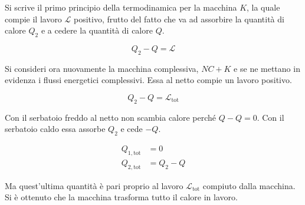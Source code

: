 \begin{figure}[htpb]
\end{figure}
\FloatBarrier
Si scrive il primo principio della termodinamica per la macchina $K$, la quale compie il lavoro $	\mathcal{L}$ positivo, frutto del fatto che va ad assorbire la quantità di calore $Q_2$ e a cedere la quantità di calore $Q$.

\[
	Q_2 - Q = \mathcal{L}
\]

Si consideri ora nuovamente la macchina complessiva, $NC+K$ e se ne mettano in evidenza i flussi energetici complessivi. Essa al netto compie un lavoro positivo.

\[
	Q_2 - Q = \mathcal{L}_\text{tot}
\]

Con il serbatoio freddo al netto non scambia calore perché $Q-Q=0$. Con il serbatoio caldo essa assorbe $Q_2$ e cede $-Q$.

\begin{align*}
	Q_{1,\text{tot}} &= 0 \\
	Q_{2,\text{tot} } &= Q_2 - Q
\end{align*}

Ma quest'ultima quantità è pari proprio al lavoro $\mathcal{L}_\text{tot}$ compiuto dalla macchina. Si è ottenuto che la macchina trasforma tutto il calore in lavoro.

